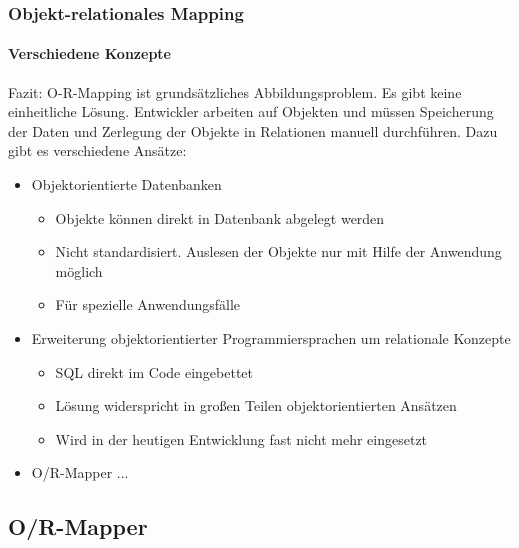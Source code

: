 \begin{frame}[t]\frametitle{Objekt-relationales Mapping}
\framesubtitle{Verschiedene Konzepte}
\alert{Fazit: O-R-Mapping ist grundsätzliches Abbildungsproblem. Es gibt keine einheitliche Lösung.}
\abs
Entwickler arbeiten auf Objekten und m\"ussen Speicherung der Daten und Zerlegung der Objekte in Relationen manuell durchführen.
\abs
Dazu gibt es verschiedene Ansätze:
\onslide\pause
\begin{itemize}
	\item Objektorientierte Datenbanken 
	\begin{itemize}
		\item Objekte k\"onnen direkt in Datenbank abgelegt werden
		\item Nicht standardisiert. Auslesen der Objekte nur mit Hilfe der Anwendung möglich
		\item F\"ur spezielle Anwendungsfälle
	\end{itemize}
	\pause
	\item Erweiterung objektorientierter Programmiersprachen um relationale Konzepte
	\begin{itemize}
		\item SQL direkt im Code eingebettet
		\item Lösung widerspricht in großen Teilen objektorientierten Ansätzen
		\item Wird in der heutigen Entwicklung fast nicht mehr eingesetzt
	\end{itemize}
	\pause
	\item O/R-Mapper ...
\end{itemize}
\end{frame}

\subsection{O/R-Mapper}

